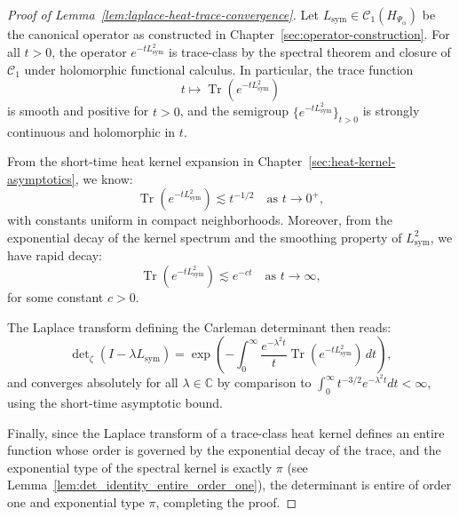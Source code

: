 \begin{proof}[Proof of Lemma~\ref{lem:laplace-heat-trace-convergence}]
Let \( L_{\mathrm{sym}} \in \mathcal{C}_1(H_{\Psi_\alpha}) \) be the canonical operator as constructed in Chapter~\ref{sec:operator-construction}. For all \( t > 0 \), the operator \( e^{-t L_{\mathrm{sym}}^2} \) is trace-class by the spectral theorem and closure of \( \mathcal{C}_1 \) under holomorphic functional calculus. In particular, the trace function
\[
t \mapsto \operatorname{Tr}(e^{-t L_{\mathrm{sym}}^2})
\]
is smooth and positive for \( t > 0 \), and the semigroup \( \{ e^{-t L_{\mathrm{sym}}^2} \}_{t>0} \) is strongly continuous and holomorphic in \( t \).

\smallskip
\noindent
From the short-time heat kernel expansion in Chapter~\ref{sec:heat-kernel-asymptotics}, we know:
\[
\operatorname{Tr}(e^{-t L_{\mathrm{sym}}^2}) \lesssim t^{-1/2} \quad \text{as } t \to 0^+,
\]
with constants uniform in compact neighborhoods. Moreover, from the exponential decay of the kernel spectrum and the smoothing property of \( L_{\mathrm{sym}}^2 \), we have rapid decay:
\[
\operatorname{Tr}(e^{-t L_{\mathrm{sym}}^2}) \lesssim e^{-ct} \quad \text{as } t \to \infty,
\]
for some constant \( c > 0 \).

\smallskip
\noindent
The Laplace transform defining the Carleman determinant then reads:
\[
\det\nolimits_\zeta(I - \lambda L_{\mathrm{sym}}) = \exp\left(- \int_0^\infty \frac{e^{-\lambda^2 t}}{t} \operatorname{Tr}(e^{-t L_{\mathrm{sym}}^2}) \, dt \right),
\]
and converges absolutely for all \( \lambda \in \mathbb{C} \) by comparison to \( \int_0^\infty t^{-3/2} e^{-\lambda^2 t} dt < \infty \), using the short-time asymptotic bound.

\smallskip
\noindent
Finally, since the Laplace transform of a trace-class heat kernel defines an entire function whose order is governed by the exponential decay of the trace, and the exponential type of the spectral kernel is exactly \( \pi \) (see Lemma~\ref{lem:det_identity_entire_order_one}), the determinant is entire of order one and exponential type \( \pi \), completing the proof.
\end{proof}
%  